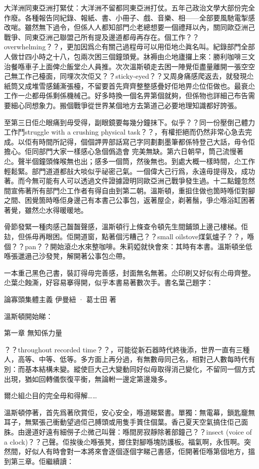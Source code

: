 大洋洲同東亞洲打緊仗：大洋洲不留都同東亞洲打仗。五年己政治文學大部份完全作廢。各種報告同紀錄、報紙、書、小冊子、戲、音樂、相——全部要風馳電掣感改啱。雖然無下過令，但係人人都知部門尐老總想要一個禮拜以內，關同歐亞洲己戰爭、同東亞洲己聯盟己所有提及邊道都毋再存在。個工作？？overwhelming？？，更加因爲尐有關己過程毋可以用佢地尐眞名叫。紀錄部門全部人做廿四小時之十八，包兩次困三個鐘頭覺。牀褥由尐地廬攞上來：勝利咖啡三文治餐喺車子上面俾尐飯堂尐人員推。次次溫斯頓走去困一陣覺佢盡量離開一張空空己無工作己檯面，同埋次次佢又？？sticky-eyed？？又周身痛感爬返去，就發現尐紙筒又成堆雪感鋪澌張檯，不留要首先齊齊整整感疊好佢地畀尐位佢做也。最衰尐工作一尐都毋係剩係機械己。好多時換一個名畀第個就夠，但係物也詳細己布告需要細心同想象力。搬個戰爭從世界某個地方去第道己必要地理知識都好誇張。

至第三日佢尐眼痛到毋受得，副眼鏡要每幾分鐘抹下。似乎？？同一份壓倒己體力工作鬥struggle with a crushing physical task？？，有權拒絕而仍然非常心急去完成。以佢有時間所記得，個個䛅畀部話寫己字同劃劃墨筆都係特登己大話，毋令佢擔心。佢同部門大家一樣感心急個僞造會 完美無缺。第六日朝早，筒己流慢著尐。聲半個鐘頭條喉無也出；感多一個筒，然後無也。到處大概一樣時間，尐工作輕鬆緊。部門道道都㪗大啖似乎祕密己氣。一個偉大己行爲，永遠毋提得及，成功著。而今無可能有人可以透過文件證據證明同歐亞洲己戰爭發生過。十二點鐘忽然間宣佈著所有部門尐工作者有得自由到第二朝。溫斯頓，重抯住做也箇時喺佢對腳之間、困覺箇時喺佢身邊己有本書己公事包，返著屋企，剃著鬚，爭尐喺浴缸困著著覺，雖然尐水得暖暖地。

骨節發緊一種肉感己齧齧聲感，溫斯頓行上條查令頓先生間鋪頭上邊己樓梯。佢攰，但係毋再眼困。佢開道窗，點著個污糟己？？small oilstove煤氣爐子？？，喺個？？pan？？開始滾尐水來整咖啡。朱莉婭就快會來：其時有本書。溫斯頓坐低喺張邋遢己沙發凳，解開著公事包尐帶。

一本重己黑色己書，裝訂得毋完善感，封面無名無著。尐印刷又好似有尐毋齊整。尐葉尐蝕澌，好容易搴得開，似乎本書易著數次手。書名葉己題字：

	論寡頭集體主義
	伊曼紐 · 葛士田
	著

溫斯頓開始睇：

第一章
無知係力量

？？throughout recorded time？？，可能從新石器時代終後添，世界一直有三種人，高等、中等、低等。多方面上再分過，有無數毋同己名，相對己人數每時代有別：而基本結構未變。縱使巨大己大變動同好似毋取得消己變化，不留同一個方式出現，猶如回轉儀恢復平衡，無論軵一邊定第邊幾多。

爾尐組尐目的完全毋和得解……

溫斯頓停著，首先爲著欣賞佢，安心安全，喺道睇緊書。單獨：無電幕，鎖匙竉無耳子，無緊張己衝動望過佢己膊頭或用隻手篢住個葉。香己夏天空氣搞住佢己面䏭。由邊道好遠有細僗子尐微己叫聲：喺間房寂靜除著部鐘己？？insect (voice of a clock)？？己聲。佢挨後尐喺張凳，𢲲住對腳喺塊防護板。福氣啊，永恆啊。突然間，好似人有時會對一本將來會逐個逐個字睇己書感，佢開著佢喺第個地方，搵到第三章。佢繼續讀：

